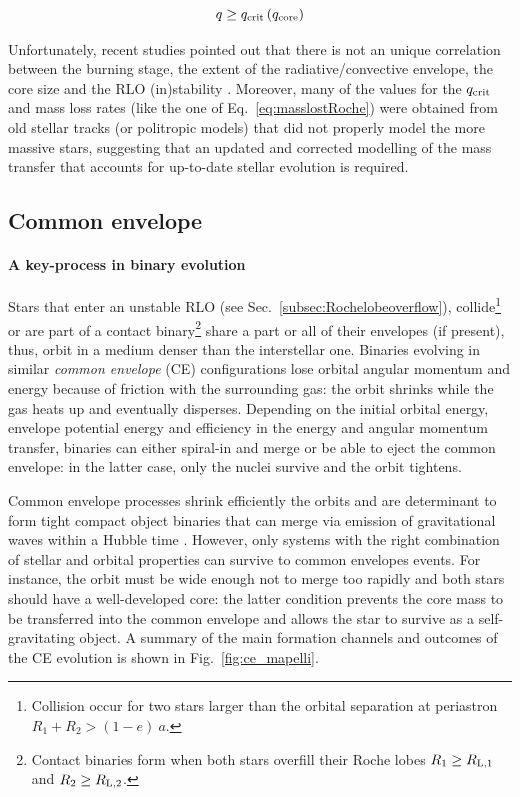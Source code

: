 \documentclass[a4paper,titlepage]{book}     	%
\newcommand{\rlone}{\ensuremath{R_\textup{L,1}}}
\newcommand{\rltwo}{\ensuremath{R_\textup{L,2}}}
\begin{document}
\begin{equation}\label{eq:qcrit}
	q \geq q_\textup{crit} \left(q_\textup{core}\right)
\end{equation}

Unfortunately, recent studies pointed out that there is not an unique correlation between the burning stage, the extent of the radiative/convective envelope, the core size and the RLO (in)stability \cite{klencki2020_mtproblems}. Moreover, many of the values for the $q_{\rm crit}$ and mass loss rates (like the one of Eq.\ \ref{eq:masslostRoche}) were obtained from old stellar tracks (or politropic models) that did not properly model the more massive stars, suggesting that an updated and corrected modelling of the mass transfer that accounts for up-to-date stellar evolution is required.



\subsection{Common envelope}\label{subsec:Commonenvelope}
\paragraph{A key-process in binary evolution} Stars that enter an unstable RLO (see Sec.\ \ref{subsec:Rochelobeoverflow}), collide\footnote{Collision occur for two stars larger than the orbital separation at periastron $R_1 + R_2 > (1-e)~a$.} or are part of a contact binary\footnote{Contact binaries form when both stars overfill their Roche lobes $R_1 \geq \rlone$ and $R_2 \geq \rltwo$.} share a part or all of their envelopes (if present), thus, orbit in a medium denser than the interstellar one. Binaries evolving in similar \emph{common envelope} (CE) configurations lose orbital angular momentum and energy because of friction with the surrounding gas: the orbit shrinks while the gas heats up and eventually disperses.  Depending on the initial orbital energy, envelope potential energy and efficiency in the energy and angular momentum transfer, binaries can either spiral-in and merge or be able to eject the common envelope: in the latter case, only the nuclei survive and the orbit tightens.

Common envelope processes shrink efficiently the orbits and are determinant to form tight compact object binaries that can merge via emission of gravitational waves within a Hubble time \cite{spera2019_mergingBBH}. However, only systems with the right combination of stellar and orbital properties can survive to common envelopes events. For instance, the orbit must be wide enough not to merge too rapidly and both stars should have a well-developed core: the latter condition prevents the core mass to be transferred into the common envelope and allows the star to survive as a self-gravitating object. A summary of the main formation channels and outcomes of the CE evolution is shown in Fig.\ \ref{fig:ce_mapelli}.
\end{document}
